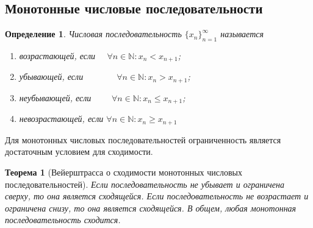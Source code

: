 \documentclass[a4paper,12pt]{article} %
\newtheorem{definition}{Определение}[subsection]
\newtheorem{theorem}{Теорема}[subsection]
\theoremstyle{remark}
\begin{document}
\subsection{Монотонные числовые последовательности}
\begin{definition}
	Числовая последовательность $\{x_n\}_{n=1}^{\infty}$ называется 
	\begin{enumerate}
		\item возрастающей, если \ \ $\forall n\in \mathbb{N}:x_{n}<x_{n+1}$;
		\item убывающей, если \ \ \ \ \ \ \ $\forall n\in \mathbb{N}:x_{n}>x_{n+1}$;
		\item неубывающей, если \ \ \ \ $\forall n\in \mathbb{N}:x_{n}\le  x_{n+1}$;
		\item невозрастающей, если $\forall n\in \mathbb{N}:x_{n}\ge x_{n+1}$
	\end{enumerate}
\end{definition}
Для монотонных числовых последовательностей ограниченность является достаточным условием для сходимости.
\begin{theorem}[Вейерштрасса о сходимости монотонных числовых последовательностей]
	Если последовательность не убывает и ограничена сверху, то она является сходящейся.
	Если последовательность не возрастает и ограничена снизу, то она является сходящейся. В общем, любая монотонная последовательность сходится.
\end{theorem}
\end{document}
